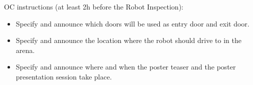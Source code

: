 \begin{enumerate}
	{\bf\item OC instructions (at least 2h before the Robot Inspection):}
	\begin{itemize}
		\item Specify and announce which doors will be used as entry door and exit door.
		\item Specify and announce the location where the robot should drive to in the arena.
		\item Specify and announce where and when the poster teaser and the poster presentation session take place.
	\end{itemize}
\end{enumerate}


